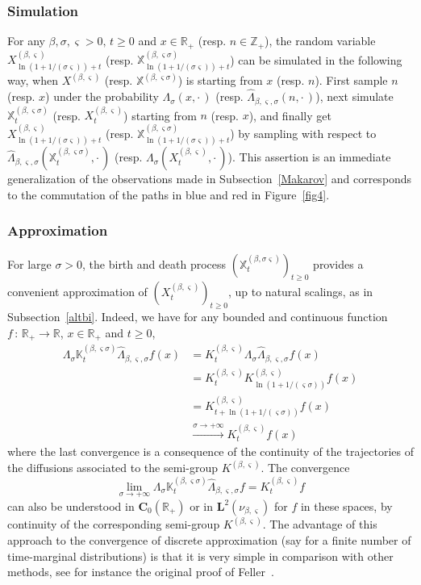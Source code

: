 \documentclass[AHL,Unicode,longabstracts]{cedram}
\newcommand{\RR}{\mathbb{R}}
\newcommand{\ZZ}{\mathbb{Z}}
\newcommand{\fX}{\mathbb{X}}
\newcommand{\iy}{\infty}
\newcommand{\ri}{\rightarrow}
\newcommand{\wit}{\widehat}
\newcommand{\st}{\,:\,}
\newcommand{\dLs}{{\discret{K}}}
\newcommand{\Ls}{K}
\newcommand{\esL}{\mathbf{L}}
\newcommand{\esC}{\mathbf{C}}
\newcommand{\discret}[1]{\mathds{#1}}
\begin{document}
\subsubsection*{Simulation}
For any $\beta,\sigma,\varsigma>0,\,t\geq 0$ and $x\in \RR_+$ (resp. $n\in\ZZ_+$), the random variable $X^{(\beta,\varsigma)}_{\ln(1+1/(\sigma\varsigma))+t}$ (resp. $\fX^{(\beta,\varsigma\sigma)}_{\ln(1+1/(\sigma\varsigma))+t}$) can be simulated in the following way, when $X^{(\beta,\varsigma)}$ (resp. $\fX^{(\beta,\varsigma\sigma)}$) is starting from $x$ (resp. $n$). First sample $n$ (resp. $x$) under the probability $\Lambda_\sigma(x,{\cdot\,})$ (resp. $\wit\Lambda_{\beta,\varsigma,\sigma}(n,{\cdot\,})$), next simulate $\fX^{(\beta,\varsigma\sigma)}_t$ (resp. $X^{(\beta,\varsigma)}_t$) starting from $n$ (resp. $x$), and finally get $X^{(\beta,\varsigma)}_{\ln(1+1/(\sigma\varsigma))+t}$ (resp. $\fX^{(\beta,\varsigma\sigma)}_{\ln(1+1/(\sigma\varsigma))+t}$) by sampling with respect to $\wit\Lambda_{\beta,\varsigma,\sigma}(\fX^{(\beta,\varsigma\sigma)}_t,{\cdot\,})$ (resp. $\Lambda_\sigma(X^{(\beta,\varsigma)}_t,{\cdot\,})$). This assertion is an immediate generalization of the observations made in Subsection~\ref{Makarov} and corresponds to the commutation of the paths in blue and red in Figure~\ref{fig4}.


\subsubsection*{Approximation}
For large $\sigma>0$, the birth and death process $(\fX_t^{(\beta,\sigma\varsigma)})_{t\geq 0}$ provides a convenient approximation of $(X_t^{(\beta,\varsigma)})_{t\geq 0}$, up to natural scalings, as in Subsection~\ref{altbi}. Indeed, we have for any bounded and continuous function $f\st\RR_+\ri\RR$, $x\in\RR_+$ and $t\geq 0$,
\begin{align*}
\Lambda_\sigma\dLs_t^{(\beta,\varsigma\sigma)}\wit\Lambda_{\beta,\varsigma,\sigma} f(x)&=
\Ls_t^{(\beta,\varsigma)}\Lambda_\sigma\wit\Lambda_{\beta,\varsigma,\sigma} f(x)\\
&= \Ls_t^{(\beta,\varsigma)}\Ls_{\ln(1+1/(\varsigma\sigma))}^{(\beta,\varsigma)}f(x)\\
&=\Ls_{t+\ln(1+1/(\varsigma\sigma))}^{(\beta,\varsigma)}f(x)\\
&\xrightarrow{\sigma\ri +\iy}\Ls_t^{(\beta,\varsigma)}f(x)
\end{align*}
where the last convergence is a consequence of the continuity of the trajectories of the diffusions associated to the semi-group $\Ls^{(\beta,\varsigma)}$. The convergence
\[
\lim_{\sigma\ri +\iy} \Lambda_\sigma\dLs_t^{(\beta,\varsigma\sigma)}\wit\Lambda_{\beta,\varsigma,\sigma}f=\Ls_t^{(\beta,\varsigma)} f
\]
can also be understood in $\esC_0(\RR_+)$ or in $\esL^2(\nu_{\beta,\varsigma})$ for $f$ in these spaces, by continuity of the corresponding semi-group $\Ls^{(\beta,\varsigma)}$. The advantage of this approach to the convergence of discrete approximation (say for a finite number of time-marginal distributions) is that it is very simple in comparison with other methods, see for instance the original proof of Feller~\cite{Feller-Gen}.
\end{document}
